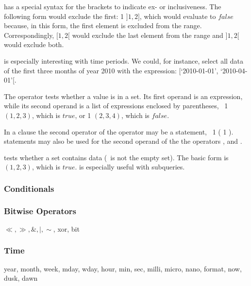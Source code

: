  has a special syntax
for the brackets to indicate
ex- or inclusiveness. The following
form would exclude the first:
1  $]1,2]$,
which would evaluate to $false$
because, in this form, the first
element is excluded from the range.
Correspondingly,
 $[1,2[$
would exclude the last element from the range
and
 $]1,2[$
would exclude both.

 is especially interesting
with time periods. We could, for instance,
select all data of the first three months
of year 2010 with the expression:
 
[`2010-01-01', `2010-04-01'[.

The operator  tests
whether a value is in a set.
Its first operand is an expression,
while its second operand is a list
of expressions enclosed by parentheses,
\eg\ 1  $(1,2,3)$,
which is $true$, or
1  $(2,3,4)$,
which is $false$.

In a  clause
the second operator of the  operator
may be a  statement, \eg\
1 
( 1  ).
\acronym{dql} statements may also be used
for the second operand of the the operators
,  and .

 tests whether a set contains
data (\ie\ is not the empty set).
The basic form is  $(1,2,3)$,
which is $true$.
 is especially useful with subqueries.


\subsubsection{Conditionals}

\subsubsection{Bitwise Operators}
$\ll, \gg, \&, |,\sim$, xor, bit


\subsubsection{Time}
year, month, week, mday, wday, hour, min,
sec, milli, micro, nano, format,
now, dusk, dawn 

